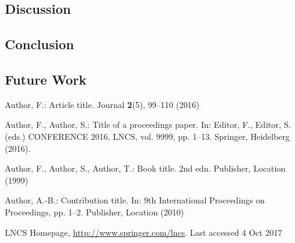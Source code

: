 \documentclass[runningheads]{llncs}
\begin{document}
\subsection{Discussion}
\subsection{Conclusion}
\subsection{Future Work}

%
%
%
% 
% 
%
\begin{thebibliography}{8}
Author, F.: Article title. Journal \textbf{2}(5), 99--110 (2016)

Author, F., Author, S.: Title of a proceedings paper. In: Editor,
F., Editor, S. (eds.) CONFERENCE 2016, LNCS, vol. 9999, pp. 1--13.
Springer, Heidelberg (2016). 

Author, F., Author, S., Author, T.: Book title. 2nd edn. Publisher,
Location (1999)

Author, A.-B.: Contribution title. In: 9th International Proceedings
on Proceedings, pp. 1--2. Publisher, Location (2010)

LNCS Homepage, \url{http://www.springer.com/lncs}. Last accessed 4
Oct 2017
\end{thebibliography}
\end{document}
